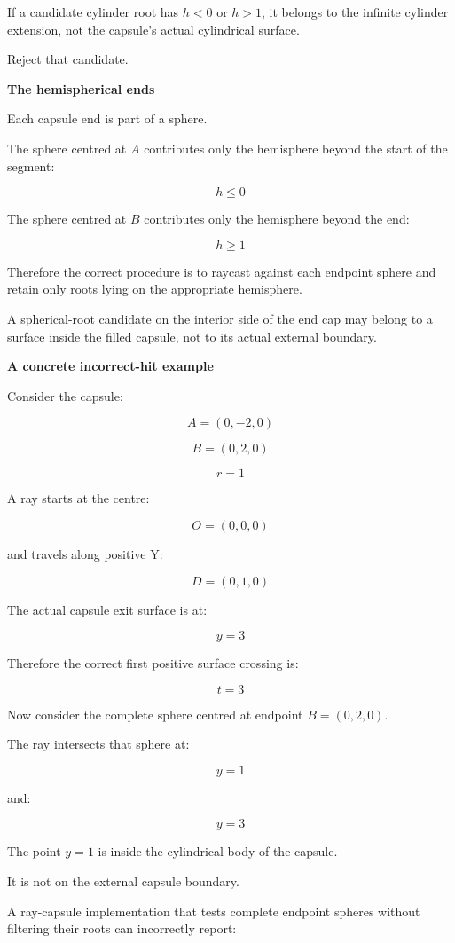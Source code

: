 If a candidate cylinder root has \(h<0\) or \(h>1\), it belongs to the infinite cylinder extension, not the capsule's actual cylindrical surface.

Reject that candidate.

\textbf{The hemispherical ends}

Each capsule end is part of a sphere.

The sphere centred at \(A\) contributes only the hemisphere beyond the start of the segment:

\[
\boxed{h\le0}
\]

The sphere centred at \(B\) contributes only the hemisphere beyond the end:

\[
\boxed{h\ge1}
\]

Therefore the correct procedure is to raycast against each endpoint sphere and retain only roots lying on the appropriate hemisphere.

A spherical-root candidate on the interior side of the end cap may belong to a surface inside the filled capsule, not to its actual external boundary.

\textbf{A concrete incorrect-hit example}

Consider the capsule:

\[
A=(0,-2,0)
\]

\[
B=(0,2,0)
\]

\[
r=1
\]

A ray starts at the centre:

\[
O=(0,0,0)
\]

and travels along positive Y:

\[
D=(0,1,0)
\]

The actual capsule exit surface is at:

\[
y=3
\]

Therefore the correct first positive surface crossing is:

\[
\boxed{t=3}
\]

Now consider the complete sphere centred at endpoint \(B=(0,2,0)\).

The ray intersects that sphere at:

\[
y=1
\]

and:

\[
y=3
\]

The point \(y=1\) is inside the cylindrical body of the capsule.

It is not on the external capsule boundary.

A ray-capsule implementation that tests complete endpoint spheres without filtering their roots can incorrectly report:

